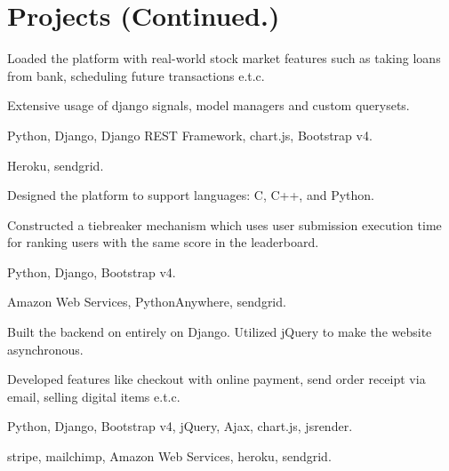 \section{Projects \small{(Continued.)}}

 \vspace{0.1in}
\begin{tightemize}
\item Loaded the platform with real-world stock market features such as taking loans from bank, scheduling future transactions e.t.c.
\item Extensive usage of django signals, model managers and custom querysets.
\item {} Python, Django, Django REST Framework, chart.js, Bootstrap v4.
\item {} Heroku, sendgrid.
\end{tightemize}
\sectionsep

\begin{tightemize}
\item Designed the platform to support languages: C, C++, and Python.
\item Constructed a tiebreaker mechanism which uses user submission execution time for ranking users with the same score in the leaderboard.
\item {} Python, Django, Bootstrap v4.
\item {} Amazon Web Services, PythonAnywhere, sendgrid.
\end{tightemize}
\sectionsep

\begin{tightemize}
\item Built the backend on entirely on Django. Utilized jQuery to make the website asynchronous.
\item Developed features like checkout with online payment, send order receipt via email, selling digital items e.t.c.
\item {} Python, Django, Bootstrap v4, jQuery, Ajax, chart.js, jsrender.
\item {} stripe, mailchimp, Amazon Web Services, heroku, sendgrid.
\end{tightemize}
\sectionsep

